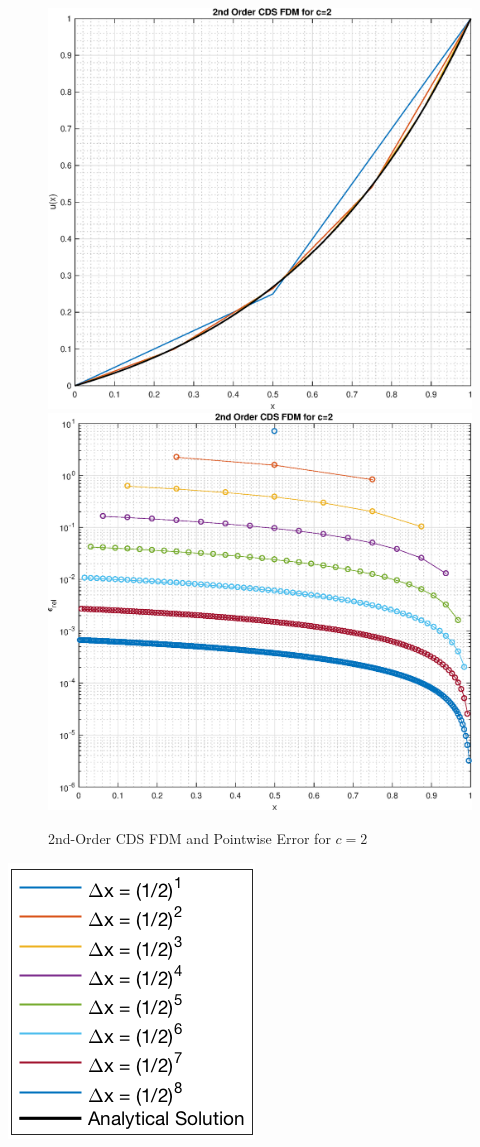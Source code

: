 \documentclass[10pt, reqno]{article}		%
\numberwithin{equation}{section}
\begin{document}
\begin{figure}[H]
	\begin{center}
		\includegraphics[width = 0.49\linewidth]{solution_2nd_order_cds_c_2}
		\includegraphics[width = 0.49\linewidth]{pointwise_error_2nd_order_cds_c_2}
		\caption{2nd-Order CDS FDM and Pointwise Error for $c = 2$}
	\end{center}
\end{figure}

\begin{center}
	\includegraphics[height = 0.11\linewidth]{legend}
\end{center}

\newpage
\end{document}
